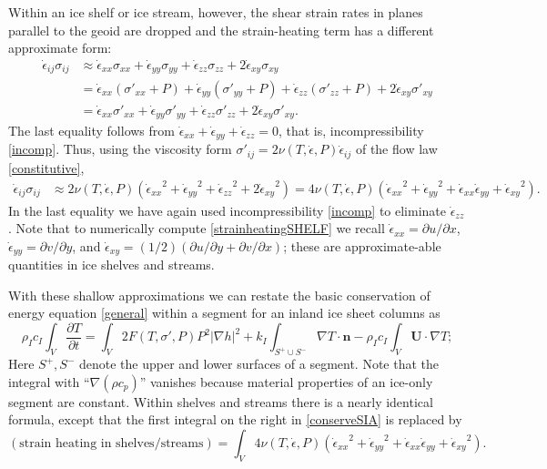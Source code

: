 \documentclass[12pt,final]{amsart}%
\theoremstyle{plain}
\theoremstyle{definition}
\theoremstyle{remark}
\newcommand{\ddt}[1]{\ensuremath{\frac{\partial #1}{\partial t}}}
\def\eps{\epsilon}
\newcommand{\grad}{\nabla}
\newcommand{\nhat}{\mathbf{n}}
\newcommand{\bU}{{\mathbf{U}}}
\begin{document}
Within an ice shelf or ice stream, however, the shear strain rates in planes parallel to the geoid are dropped and the strain-heating term has a different approximate form:
\begin{align*}
\dot\eps_{ij}\sigma_{ij} &\approx \dot\eps_{xx}\sigma_{xx} + \dot\eps_{yy}\sigma_{yy} + \dot\eps_{zz}\sigma_{zz} + 2 \dot\eps_{xy}\sigma_{xy} \\
    &= \dot\eps_{xx}(\sigma'_{xx} + P) + \dot\eps_{yy}(\sigma'_{yy} + P) + \dot\eps_{zz}(\sigma'_{zz} + P) + 2 \dot\eps_{xy}\sigma'_{xy} \\
    &= \dot\eps_{xx}\sigma'_{xx} + \dot\eps_{yy}\sigma'_{yy} + \dot\eps_{zz}\sigma'_{zz}  + 2 \dot\eps_{xy}\sigma'_{xy}.
\end{align*}
The last equality follows from $\dot\eps_{xx} + \dot\eps_{yy} + \dot\eps_{zz} = 0$, that is, incompressibility \eqref{incomp}.  Thus, using the viscosity form $\sigma'_{ij} = 2 \nu(T,\dot\eps,P) \dot\eps_{ij}$ of the flow law \eqref{constitutive},
\begin{align}
\dot\eps_{ij}\sigma_{ij} &\approx 2 \nu(T,\dot\eps,P) \left({\dot\eps_{xx}}^2 + {\dot\eps_{yy}}^2 + {\dot\eps_{zz}}^2  + 2{\dot\eps_{xy}}^2\right) = 4 \nu(T,\dot\eps,P) \left({\dot\eps_{xx}}^2 + {\dot\eps_{yy}}^2 + \dot\eps_{xx} \dot\eps_{yy} + {\dot\eps_{xy}}^2\right). \label{strainheatingSHELF}
\end{align}
In the last equality we have again used incompressibility \eqref{incomp} to eliminate $\dot\eps_{zz}$.  Note that to numerically compute \eqref{strainheatingSHELF} we recall $\dot\eps_{xx} = \partial u/\partial x$, $\dot\eps_{yy} = \partial v/\partial y$, and $\dot\eps_{xy} = (1/2)\left(\partial u/\partial y + \partial v/\partial x\right)$; these are approximate-able quantities in ice shelves and streams.

With these shallow approximations we can restate the basic conservation of energy equation \eqref{general} within a segment for an inland ice sheet columns as
\begin{equation}\label{conserveSIA}
\rho_I c_I \int_V \ddt{T} = \int_V 2 F(T,\sigma',P) P^2 |\grad h|^2 + k_I \int_{S^+ \cup S^-} \grad T \cdot \nhat - \rho_I c_I \int_V \bU \cdot \grad T;
\end{equation}
Here $S^+,S^-$ denote the upper and lower surfaces of a segment.  Note that the integral with ``$\grad(\rho c_p)$'' vanishes because material properties of an ice-only segment are constant.  Within shelves and streams there is a nearly identical formula, except that the first integral on the right in \eqref{conserveSIA} is replaced by
\begin{equation}\label{conserveSHELF}
(\text{strain heating in shelves/streams}) =  \int_V 4 \nu(T,\dot\eps,P) \left({\dot\eps_{xx}}^2 + {\dot\eps_{yy}}^2 + \dot\eps_{xx} \dot\eps_{yy} + {\dot\eps_{xy}}^2\right).
\end{equation}
\end{document}
